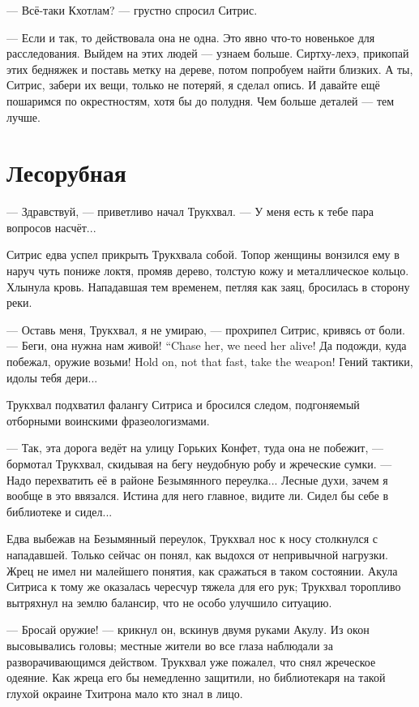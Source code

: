 --- Всё-таки Кхотлам? --- грустно спросил Ситрис.

--- Если и так, то действовала она не одна.
Это явно что-то новенькое для расследования.
Выйдем на этих людей --- узнаем больше.
Сиртху-лехэ, прикопай этих бедняжек и поставь метку на дереве, потом попробуем найти близких.
А ты, Ситрис, забери их вещи, только не потеряй, я сделал опись.
И давайте ещё пошаримся по окрестностям, хотя бы до полудня.
Чем больше деталей --- тем лучше.

\section{Лесорубная}

--- Здравствуй, --- приветливо начал Трукхвал.
--- У меня есть к тебе пара вопросов насчёт...

Ситрис едва успел прикрыть Трукхвала собой.
Топор женщины вонзился ему в наруч чуть пониже локтя, промяв дерево, толстую кожу и металлическое кольцо.
Хлынула кровь.
Нападавшая тем временем, петляя как заяц, бросилась в сторону реки.

--- Оставь меня, Трукхвал, я не умираю, --- прохрипел Ситрис, кривясь от боли.
{--- Беги, она нужна нам живой!}
{``Chase her, we need her alive!}
{Да подожди, куда побежал, оружие возьми!}
{Hold on, not that fast, take the weapon!}
Гений тактики, идолы тебя дери...

Трукхвал подхватил фалангу Ситриса и бросился следом, подгоняемый отборными воинскими фразеологизмами.

--- Так, эта дорога ведёт на улицу Горьких Конфет, туда она не побежит, --- бормотал Трукхвал, скидывая на бегу неудобную робу и жреческие сумки.
--- Надо перехватить её в районе Безымянного переулка...
Лесные духи, зачем я вообще в это ввязался.
Истина для него главное, видите ли.
Сидел бы себе в библиотеке и сидел...

Едва выбежав на Безымянный переулок, Трукхвал нос к носу столкнулся с нападавшей.
Только сейчас он понял, как выдохся от непривычной нагрузки.
Жрец не имел ни малейшего понятия, как сражаться в таком состоянии.
Акула Ситриса к тому же оказалась чересчур тяжела для его рук;
Трукхвал торопливо вытряхнул на землю балансир, что не особо улучшило ситуацию.

--- Бросай оружие! --- крикнул он, вскинув двумя руками Акулу.
Из окон высовывались головы;
местные жители во все глаза наблюдали за разворачивающимся действом.
Трукхвал уже пожалел, что снял жреческое одеяние.
Как жреца его бы немедленно защитили, но библиотекаря на такой глухой окраине Тхитрона мало кто знал в лицо.

